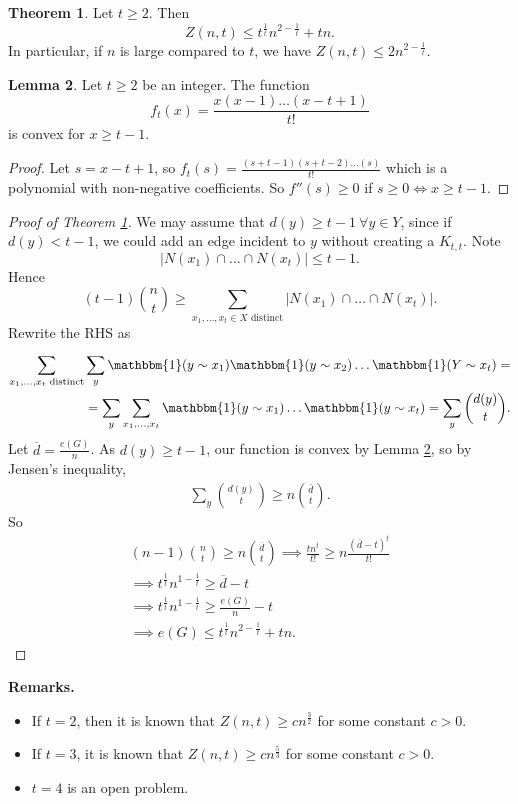 \documentclass{article}
\theoremstyle{definition}
\newtheorem{theorem}{Theorem}[section]
\newtheorem{lemma}[theorem]{Lemma}
\begin{document}
\begin{theorem}\label{4.8}
    Let $t\ge 2$. Then $$Z(n,t) \le t^{\frac{1}{t}} n^{2-\frac{1}{t}} + tn.$$
    In particular, if $n$ is large compared to $t$, we have $Z(n,t) \le 2n^{2-\frac{1}{t}}$. 
\end{theorem}
\begin{lemma}\label{4.9}
    Let $t\ge 2$ be an integer. The function $$f_t(x) = \frac{x(x-1)\ldots(x-t+1)}{t!}$$ is convex for $x\ge t-1$.
\end{lemma}
\begin{proof}
    Let $s=x-t+1$, so $f_t(s) = \frac{(s+t-1)(s+t-2)\ldots(s)}{t!}$ which is a polynomial with non-negative coefficients. So $f''(s)\ge 0$ if $s\ge 0 \iff x\ge t-1$.
\end{proof}
\begin{proof}[Proof of Theorem \ref{4.8}]
    We may assume that $d(y)\ge t-1 ~\forall y \in Y$, since if $d(y)<t-1$, we could add an edge incident to $y$ without creating a $K_{t,t}$. Note
    \[
    |N(x_1) \cap\ldots \cap N(x_t)|\le t-1.
    \]
    Hence \[
    (t-1){{n}\choose{t}} \ge \sum_{x_1,\ldots,x_t \in X \text{ distinct}}^{} |N(x_1) \cap\ldots \cap N(x_t)|.
    \]
    Rewrite the RHS as 
    \begin{align*}
        \sum_{x_1,\ldots,x_t \text{ distinct}}^{} \sum_{y}^{} \mathbbm{1}(y \sim x_1)\mathbbm{1}(y \sim x_2) \ldots \mathbbm{1}(Y\sim x_t) = \\
        =\sum_{y}^{} \sum_{x_1,\ldots,x_t}^{} \mathbbm{1}(y \sim x_1)\ldots \mathbbm{1}(y \sim x_t) = \sum_{y}^{} {{d(y)\choose{t}}}.
    \end{align*}
    Let $\overline{d} = \frac{e(G)}{n}$. As $d(y)\ge t-1$, our function is convex by Lemma \ref{4.9}, so by Jensen's inequality, 
    \begin{align*}
        \sum_{y}^{} {{d(y)\choose{t}}} \ge n {{\bar{d}\choose{t}}}.
    \end{align*}
    So 
    \begin{align*}
        (n-1){{n}\choose{t}} \ge n {{\overline{d}}\choose{t}} \implies \frac{tn^t}{t!} \ge n \frac{(\overline{d}-t)^t}{t!} \\
        \implies t^{\frac{1}{t}}n^{1-\frac{1}{t}} \ge \overline{d}-t \\
        \implies t^{\frac{1}{t}}n^{1-\frac{1}{t}} \ge \frac{e(G)}{n}-t \\
        \implies e(G) \le t^{\frac{1}{t}} n^{2-\frac{1}{t}} + tn. 
    \end{align*}
\end{proof}
\textbf{Remarks.}
\begin{itemize}
    \item If $t=2$, then it is known that $Z(n,t)\ge c n^{\frac{3}{2}}$ for some constant $c>0$.
    \item If $t=3$, it is known that $Z(n,t) \ge c n^{\frac{5}{3}}$ for some constant $c>0$.
    \item $t=4$ is an open problem.
\end{itemize}
\end{document}
